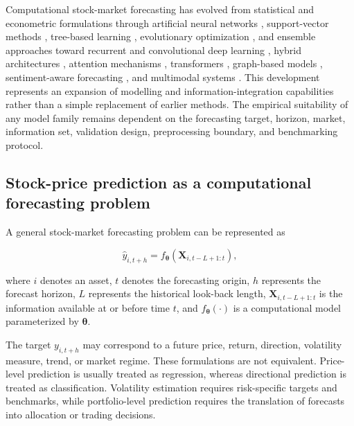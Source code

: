 \documentclass[pdflatex,sn-mathphys-num]{sn-jnl}%
\theoremstyle{thmstyleone}%
\theoremstyle{thmstyletwo}%
\theoremstyle{thmstylethree}%
\begin{document}
Computational stock-market forecasting has evolved from statistical and
econometric formulations through artificial neural networks \cite{P00056,P00278,P00439}, support-vector
methods \cite{P02381, P03885, P03886}, tree-based learning \cite{P00796}, evolutionary optimization \cite{P00278,P00439}, and ensemble
approaches toward recurrent and convolutional deep learning \cite{P00451}, hybrid
architectures \cite{P00797}, attention mechanisms \cite{P00579}, transformers \cite{P00451,P00517,P00579}, graph-based models \cite{P00050,P00186,P00513},
sentiment-aware forecasting \cite{P00050,P00186,P00513}, and multimodal systems \cite{P00160,P00420,P01052}. This development
represents an expansion of modelling and information-integration capabilities
rather than a simple replacement of earlier methods. The empirical suitability
of any model family remains dependent on the forecasting target, horizon,
market, information set, validation design, preprocessing boundary, and
benchmarking protocol.

\subsection{Stock-price prediction as a computational forecasting problem}
\label{subsec:computational_forecasting_problem}

A general stock-market forecasting problem can be represented as

\begin{equation}
    \widehat{y}_{i,t+h}
    =
    f_{\boldsymbol{\theta}}
    \left(
        \mathbf{X}_{i,t-L+1:t}
    \right),
\end{equation}

where \(i\) denotes an asset, \(t\) denotes the forecasting origin, \(h\)
represents the forecast horizon, \(L\) represents the historical look-back
length, \(\mathbf{X}_{i,t-L+1:t}\) is the information available at or before
time \(t\), and \(f_{\boldsymbol{\theta}}(\cdot)\) is a computational model
parameterized by \(\boldsymbol{\theta}\).

The target \(y_{i,t+h}\) may correspond to a future price, return, direction,
volatility measure, trend, or market regime. These formulations are not
equivalent. Price-level prediction is usually treated as regression, whereas
directional prediction is treated as classification. Volatility estimation
requires risk-specific targets and benchmarks, while portfolio-level
prediction requires the translation of forecasts into allocation or trading
decisions.
\end{document}
